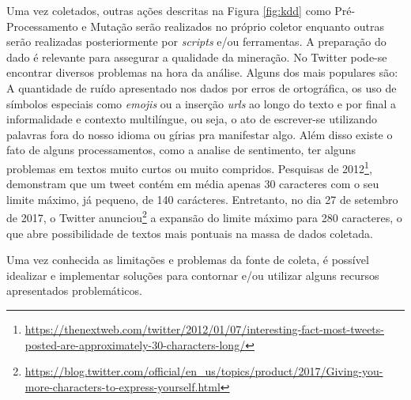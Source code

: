 Uma vez coletados, outras ações descritas na Figura \ref{fig:kdd} como Pré-Processamento e Mutação serão realizados no próprio coletor enquanto outras serão realizadas posteriormente por \textit{scripts} e/ou ferramentas. A preparação do dado é relevante para assegurar a qualidade da mineração. No Twitter pode-se encontrar diversos problemas na hora da análise. Alguns dos mais populares são: A quantidade de ruído apresentado nos dados por erros de ortográfica, os uso de símbolos especiais como \textit{emojis} ou a inserção \textit{urls} ao longo do texto e por final a informalidade e contexto multilíngue, ou seja, o ato de escrever-se utilizando palavras fora do nosso idioma ou gírias pra manifestar algo. Além disso existe o fato de alguns processamentos, como a analise de sentimento, ter alguns problemas em textos muito curtos ou muito compridos. Pesquisas de 2012\footnote{\url{https://thenextweb.com/twitter/2012/01/07/interesting-fact-most-tweets-posted-are-approximately-30-characters-long/}}, demonstram que um tweet contém em média apenas 30 caracteres com o seu limite máximo, já pequeno, de 140 carácteres. \cite[9-11]{silva2016analise} Entretanto, no dia 27 de setembro de 2017, o Twitter anunciou\footnote{\url{https://blog.twitter.com/official/en_us/topics/product/2017/Giving-you-more-characters-to-express-yourself.html}} a expansão do limite máximo para 280 caracteres, o que abre possibilidade de textos mais pontuais na massa de dados coletada.

Uma vez conhecida as limitações e problemas da fonte de coleta, é possível idealizar e implementar soluções para contornar e/ou utilizar alguns recursos apresentados problemáticos.
